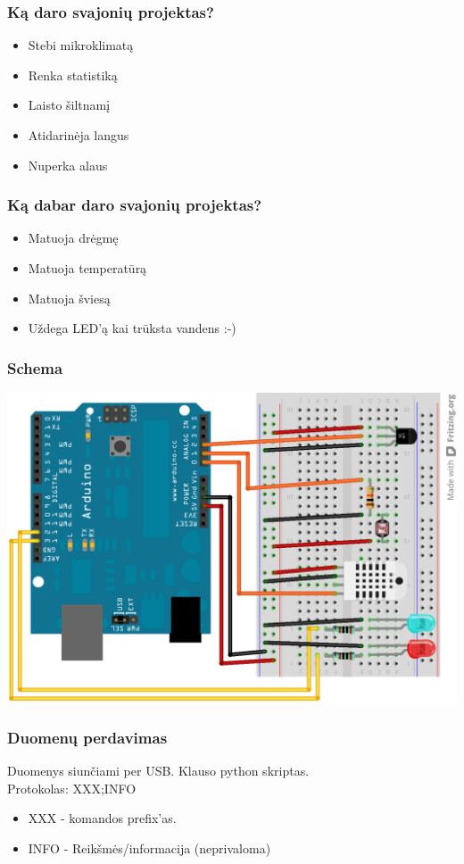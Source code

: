\documentclass[12pt,a4paper]{beamer}
\begin{document}
\begin{frame}
    \frametitle{Ką daro svajonių projektas?}

    \begin{itemize}
        \item Stebi mikroklimatą
        \item Renka statistiką
        \item Laisto šiltnamį
        \item Atidarinėja langus
        \item Nuperka alaus
    \end{itemize}
\end{frame}

\begin{frame}
    \frametitle{Ką dabar daro svajonių projektas?}

    \begin{itemize}
        \item Matuoja drėgmę
        \item Matuoja temperatūrą
        \item Matuoja šviesą
        \item Uždega LED'ą kai trūksta vandens :-)
    \end{itemize}
    
\end{frame}

\begin{frame}
    \frametitle{Schema}
    \includegraphics[scale=0.2]{img/schema.png}
\end{frame}

\begin{frame}
    \frametitle{Duomenų perdavimas}

    Duomenys siunčiami per USB. Klauso python skriptas.\\
    \vskip1cm
    Protokolas: XXX;INFO

    \begin{itemize}
        \item XXX - komandos prefix'as.
        \item INFO - Reikšmės/informacija (neprivaloma)
    \end{itemize}
\end{frame}
\end{document}
